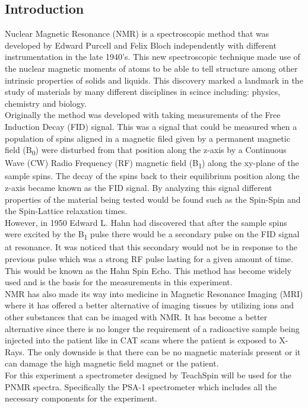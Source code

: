\documentclass{article}
\begin{document}
{\begin{multicols}{2}
\section{Introduction}
Nuclear Magnetic Resonance (NMR) is a spectroscopic method that was developed 
by Edward Purcell and Felix Bloch independently with different instrumentation 
in the late 1940's. This new spectroscopic technique made use of the nuclear 
magnetic moments of atoms to be able to tell structure among other intrinsic 
properties of solids and liquids. This discovery marked a landmark in the 
study of materials by many different disciplines in scince including: physics, 
chemistry and biology. 
\\
Originally the method was developed with taking measurements of the Free 
Induction Decay (FID) signal. This was a signal that could be measured when 
a population of spins aligned in a magnetic filed given by a permanent 
magnetic field (B\textsubscript{0}) were disturbed from that position along 
the z-axis by a Continuous Wave (CW) Radio Frequency (RF) magnetic field 
(B\textsubscript{1}) along the xy-plane of the sample spins. The decay of the 
spins back to their equilibrium position along the z-axis became known as the 
FID signal. By analyzing this signal different properties of the material 
being tested would be found such as the Spin-Spin and the Spin-Lattice 
relaxation times.
\\
However, in 1950 Edward L. Hahn had discovered that after the sample spins were excited by the B\textsubscript{1} pulse there would be a secondary pulse on the
FID signal at resonance. It was noticed that this secondary would not be in 
response to the previous pulse which was a strong RF pulse lasting for a given 
amount of time. This would be known as the Hahn Spin Echo. This method has 
become widely used and is the basis for the measurements in this experiment.
\\
NMR has also made its way into medicine in Magnetic Resonance Imaging (MRI) 
where it has offered a better alternative of imaging tissues by utilizing ions 
and other substances that can be imaged with NMR. It has become a better 
alternative since there is no longer the requirement of a radioactive sample 
being injected into the patient like in CAT scans where the patient is exposed 
to X-Rays. The only downside is that there can be no magnetic materials present 
or it can damage the high magnetic field magnet or the patient.
\\
For this experiment a spectrometer designed by TeachSpin will be used for the 
PNMR spectra. Specifically the PSA-1 spectrometer which includes all the 
necessary components for the experiment.

\end{multicols}}
\end{document}
